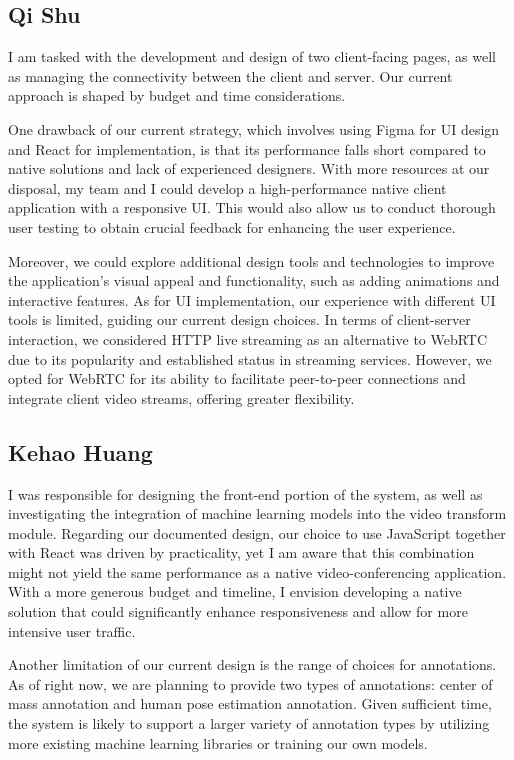 \documentclass[12pt, titlepage]{article}
\begin{document}
\subsection{Qi Shu}
I am tasked with the development and design of two client-facing pages, as well as managing the connectivity between the client and server. Our current approach is shaped by budget and time considerations.

One drawback of our current strategy, which involves using Figma for UI design and React for implementation, is that its performance falls short compared to native solutions and lack of experienced designers. With more resources at our disposal, my team and I could develop a high-performance native client application with a responsive UI. This would also allow us to conduct thorough user testing to obtain crucial feedback for enhancing the user experience.

Moreover, we could explore additional design tools and technologies to improve the application's visual appeal and functionality, such as adding animations and interactive features.
As for UI implementation, our experience with different UI tools is limited, guiding our current design choices. In terms of client-server interaction, we considered HTTP live streaming as an alternative to WebRTC due to its popularity and established status in streaming services. However, we opted for WebRTC for its ability to facilitate peer-to-peer connections and integrate client video streams, offering greater flexibility.

\subsection{Kehao Huang}
I was responsible for designing the front-end portion of the system, as well as investigating the integration of machine learning models into the video transform module. Regarding our documented design, our choice to use JavaScript together with React was driven by practicality, yet I am aware that this combination might not yield the same performance as a native video-conferencing application. With a more generous budget and timeline, I envision developing a native solution that could significantly enhance responsiveness and allow for more intensive user traffic.

Another limitation of our current design is the range of choices for annotations. As of right now, we are planning to provide two types of annotations: center of mass annotation and human pose estimation annotation. Given sufficient time, the system is likely to support a larger variety of annotation types by utilizing more existing machine learning libraries or training our own models.
\end{document}

